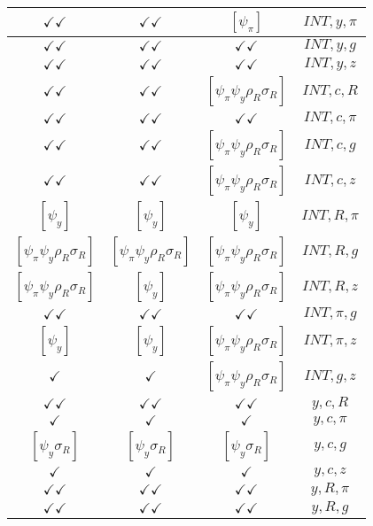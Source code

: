 \documentclass[a4paper,10pt]{article}
\begin{document}
\begin{longtable}{|c|c|c|c|}
\hline
$\checkmark\checkmark$ & $\checkmark\checkmark$ & $[\psi_\pi ]$ & ${INT},{y},{\pi}$ \\
\hline
$\checkmark\checkmark$ & $\checkmark\checkmark$ & $\checkmark\checkmark$ & ${INT},{y},{g}$ \\
\hline
$\checkmark\checkmark$ & $\checkmark\checkmark$ & $\checkmark\checkmark$ & ${INT},{y},{z}$ \\
\hline
$\checkmark\checkmark$ & $\checkmark\checkmark$ & $[\psi_\pi \psi_y \rho_R \sigma_R ]$ & ${INT},{c},{R}$ \\
\hline
$\checkmark\checkmark$ & $\checkmark\checkmark$ & $\checkmark\checkmark$ & ${INT},{c},{\pi}$ \\
\hline
$\checkmark\checkmark$ & $\checkmark\checkmark$ & $[\psi_\pi \psi_y \rho_R \sigma_R ]$ & ${INT},{c},{g}$ \\
\hline
$\checkmark\checkmark$ & $\checkmark\checkmark$ & $[\psi_\pi \psi_y \rho_R \sigma_R ]$ & ${INT},{c},{z}$ \\
\hline
$[\psi_y ]$ & $[\psi_y ]$ & $[\psi_y ]$ & ${INT},{R},{\pi}$ \\
\hline
$[\psi_\pi \psi_y \rho_R \sigma_R ]$ & $[\psi_\pi \psi_y \rho_R \sigma_R ]$ & $[\psi_\pi \psi_y \rho_R \sigma_R ]$ & ${INT},{R},{g}$ \\
\hline
$[\psi_\pi \psi_y \rho_R \sigma_R ]$ & $[\psi_y ]$ & $[\psi_\pi \psi_y \rho_R \sigma_R ]$ & ${INT},{R},{z}$ \\
\hline
$\checkmark\checkmark$ & $\checkmark\checkmark$ & $\checkmark\checkmark$ & ${INT},{\pi},{g}$ \\
\hline
$[\psi_y ]$ & $[\psi_y ]$ & $[\psi_\pi \psi_y \rho_R \sigma_R ]$ & ${INT},{\pi},{z}$ \\
\hline
$\checkmark$ & $\checkmark$ & $[\psi_\pi \psi_y \rho_R \sigma_R ]$ & ${INT},{g},{z}$ \\
\hline
$\checkmark\checkmark$ & $\checkmark\checkmark$ & $\checkmark\checkmark$ & ${y},{c},{R}$ \\
\hline
$\checkmark$ & $\checkmark$ & $\checkmark$ & ${y},{c},{\pi}$ \\
\hline
$[\psi_y \sigma_R ]$ & $[\psi_y \sigma_R ]$ & $[\psi_y \sigma_R ]$ & ${y},{c},{g}$ \\
\hline
$\checkmark$ & $\checkmark$ & $\checkmark$ & ${y},{c},{z}$ \\
\hline
$\checkmark\checkmark$ & $\checkmark\checkmark$ & $\checkmark\checkmark$ & ${y},{R},{\pi}$ \\
\hline
$\checkmark\checkmark$ & $\checkmark\checkmark$ & $\checkmark\checkmark$ & ${y},{R},{g}$ \\

\end{longtable}
\end{document}
